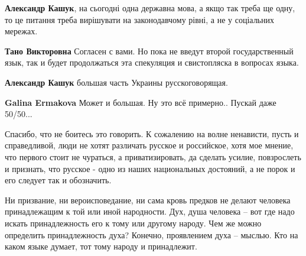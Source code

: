 \begin{itemize}
\begin{itemize}
\textbf{Александр Кашук}, на сьогодні одна державна мова, а якщо так треба ще
одну, то це питання треба вирішувати на законодавчому рівні, а не у соціальних
мережах.

\textbf{Тано Викторовна} Согласен с вами. Но пока не введут второй
государственный язык, так и будет продолжаться эта спекуляция и свистопляска в
вопросах языка.

\textbf{Александр Кашук} большая часть Украины русскоговорящая.

\textbf{Galina Ermakova} Может и большая. Ну это всё примерно.. Пускай даже 50/50...

\end{itemize}



Спасибо, что не боитесь это говорить. К сожалению на волне ненависти, пусть и
справедливой, люди не хотят различать русское и российское, хотя мое мнение,
что первого стоит не чураться, а приватизировать, да сделать усилие,
повзрослеть и признать, что русское - одно из наших национальных достояний, а
не порок и его следует так и обозначить.


Ни призвание, ни вероисповедание, ни сама кровь предков не делают человека
принадлежащим к той или иной народности. Дух, душа человека – вот где надо
искать принадлежность его к тому или другому народу. Чем же можно определить
принадлежность духа? Конечно, проявлением духа – мыслью. Кто на каком языке
думает, тот тому народу и принадлежит.



\end{itemize}
